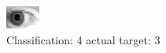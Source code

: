 \begin{figure}[h!]
\begin{center}
\includegraphics[width=0.60\columnwidth]{figures/ID338_class_4_target_3.png}
\end{center}
\caption{ Classification: 4 actual target: 3}
\label{fig:ID338_class_4_target_3}
\end{figure}
